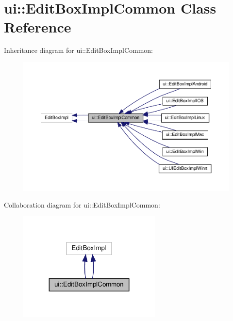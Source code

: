 \hypertarget{classui_1_1EditBoxImplCommon}{}\section{ui\+:\+:Edit\+Box\+Impl\+Common Class Reference}
\label{classui_1_1EditBoxImplCommon}


Inheritance diagram for ui\+:\+:Edit\+Box\+Impl\+Common\+:
\nopagebreak
\begin{figure}[H]
\begin{center}
\leavevmode
\includegraphics[width=350pt]{classui_1_1EditBoxImplCommon__inherit__graph}
\end{center}
\end{figure}


Collaboration diagram for ui\+:\+:Edit\+Box\+Impl\+Common\+:
\nopagebreak
\begin{figure}[H]
\begin{center}
\leavevmode
\includegraphics[width=203pt]{classui_1_1EditBoxImplCommon__coll__graph}
\end{center}
\end{figure}
